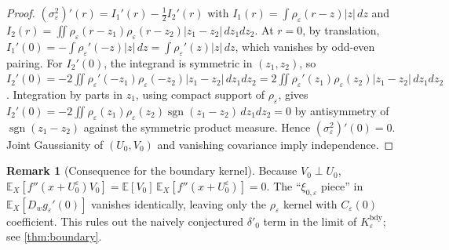 \documentclass[11pt,reqno]{amsart}
\theoremstyle{plain}
\theoremstyle{definition}
\newtheorem{remark}[theorem]{Remark}
\theoremstyle{remark}
\newcommand{\E}{\mathbb{E}}
\DeclareMathOperator{\sgn}{sgn}
\begin{document}
\begin{proof}
$(\sigma_{\varepsilon}^{2})'(r)=I_{1}'(r)-\tfrac12 I_{2}'(r)$ with
$I_{1}(r)=\int\rho_{\varepsilon}(r-z)|z|\,dz$ and
$I_{2}(r)=\iint\rho_{\varepsilon}(r-z_{1})\rho_{\varepsilon}(r-z_{2})|z_{1}-z_{2}|\,dz_{1}dz_{2}$.
At $r=0$, by translation,
$I_{1}'(0)=-\int\rho_{\varepsilon}'(-z)|z|\,dz=\int\rho_{\varepsilon}'(z)|z|\,dz$,
which vanishes by odd-even pairing. For $I_{2}'(0)$, the integrand
is symmetric in $(z_{1},z_{2})$, so
$I_{2}'(0)=-2\iint\rho_{\varepsilon}'(-z_{1})\rho_{\varepsilon}(-z_{2})|z_{1}-z_{2}|\,dz_{1}dz_{2}
=2\iint\rho_{\varepsilon}'(z_{1})\rho_{\varepsilon}(z_{2})|z_{1}-z_{2}|\,dz_{1}dz_{2}$.
Integration by parts in $z_{1}$, using compact support of
$\rho_{\varepsilon}$, gives
$I_{2}'(0)=-2\iint\rho_{\varepsilon}(z_{1})\rho_{\varepsilon}(z_{2})\sgn(z_{1}-z_{2})\,dz_{1}dz_{2}=0$
by antisymmetry of $\sgn(z_{1}-z_{2})$ against the symmetric
product measure. Hence $(\sigma_{\varepsilon}^{2})'(0)=0$. Joint
Gaussianity of $(U_{0},V_{0})$ and vanishing covariance imply
independence.
\end{proof}

\begin{remark}[Consequence for the boundary kernel]
\label{rem:bdy-coeff}
Because $V_{0}\perp U_{0}$, $\E_{X}[f''(x+U_{0}^{\varepsilon})V_{0}]
=\E[V_{0}]\,\E_{X}[f''(x+U_{0}^{\varepsilon})]=0$. The
``$\xi_{0,\varepsilon}$ piece'' in $\E_{X}[D_{w}g_{\varepsilon}'(0)]$
vanishes identically, leaving only the $\rho_{\varepsilon}$ kernel
with $C_{\varepsilon}(0)$ coefficient. This rules out the naively
conjectured $\delta'_{0}$ term in the limit of
$K_{\varepsilon}^{\mathrm{bdy}}$; see \cref{thm:boundary}.
\end{remark}
\end{document}
